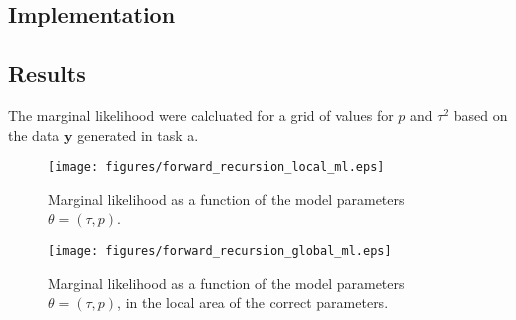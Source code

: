 \documentclass[10pt,a4paper]{article}
\begin{document}
\subsection{Implementation}
\subsection{Results}
The marginal likelihood were calcluated for a grid of values for $p$ and $\tau^2$ based on the data $\mathbf{y}$ generated in task a.
\begin{figure}[h]
    \centering
    \texttt{[image: figures/forward\_recursion\_local\_ml.eps]}
    \caption{Marginal likelihood as a function of the model parameters $\theta = (\tau,p)$.}
    \label{fig:forward_recursion_local_ml}
\end{figure}

\begin{figure}[h]
    \centering
    \texttt{[image: figures/forward\_recursion\_global\_ml.eps]}
    \caption{Marginal likelihood as a function of the model parameters $\theta = (\tau,p)$, in the local area of the correct parameters.}
    \label{fig:forward_recursion_global_ml}
\end{figure}
\end{document}
